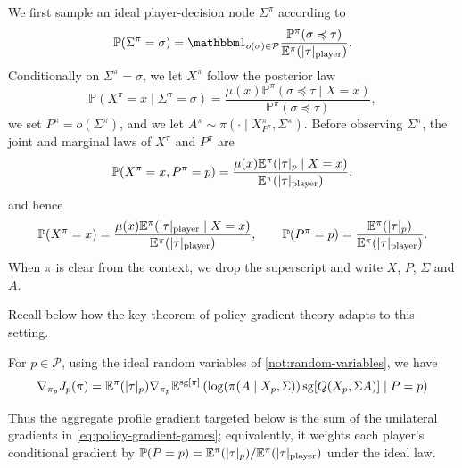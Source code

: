 \documentclass[12pt, a4paper]{article}
\begin{document}
\begin{notation}\label{not:random-variables}
We first sample an ideal player-decision node $\Sigma^\pi$ according to
\begin{equation}\label{eq:stationary-node-law}
  \mathbb{P}(\Sigma^\pi = \sigma)
  = \one_{o(\sigma)\in\mathcal P}
  \frac{\mathbb{P}^\pi(\sigma \preccurlyeq \tau)}
       {\mathbb{E}^\pi(|\tau|_{\textnormal{player}})}.
\end{equation}
Conditionally on $\Sigma^\pi=\sigma$, we let $X^\pi$ follow the posterior law
\begin{equation}\label{eq:ideal-private-profile-law}
  \mathbb{P}(X^\pi=x\mid\Sigma^\pi=\sigma)
  =
  \frac{\mu(x)\mathbb{P}^\pi(\sigma\preccurlyeq\tau\mid X=x)}
       {\mathbb{P}^\pi(\sigma\preccurlyeq\tau)},
\end{equation}
we set $P^\pi=o(\Sigma^\pi)$, and we let
$A^\pi\sim\pi(\cdot\mid X^\pi_{P^\pi},\Sigma^\pi)$.
Before observing $\Sigma^\pi$, the joint and marginal laws of $X^\pi$ and $P^\pi$ are
\begin{equation}\label{eq:ideal-profile-player-law}
  \mathbb{P}(X^\pi=x,P^\pi=p)
  = \frac{\mu(x)\mathbb{E}^\pi(|\tau|_p\mid X=x)}
           {\mathbb{E}^\pi(|\tau|_{\textnormal{player}})},
\end{equation}
and hence
\begin{equation}\label{eq:ideal-profile-and-player-marginals}
  \mathbb{P}(X^\pi=x)
  = \frac{\mu(x)\mathbb{E}^\pi(|\tau|_{\textnormal{player}}\mid X=x)}
           {\mathbb{E}^\pi(|\tau|_{\textnormal{player}})},
  \qquad
  \mathbb{P}(P^\pi=p)
  = \frac{\mathbb{E}^\pi(|\tau|_p)}
           {\mathbb{E}^\pi(|\tau|_{\textnormal{player}})}.
\end{equation}
When $\pi$ is clear from the context, we drop the superscript and write $X$, $P$, $\Sigma$ and $A$.
\end{notation}

Recall below how the key theorem of policy gradient theory adapts to this setting.

\begin{theorem}\label{thm:policy-gradient-games}
  For $p \in \mathcal{P}$, using the ideal random variables of \autoref{not:random-variables}, we have
  \begin{equation}\label{eq:policy-gradient-games}
    \nabla_{\pi_p} J_p(\pi)
    = \mathbb{E}^\pi(|\tau|_{p}) \nabla_{\pi_p} \mathbb{E}^{\operatorname{sg}[\pi]}\left(\log(\pi(A \mid X_p, \Sigma)) \operatorname{sg}[Q(X_p, \Sigma A)] \mid P = p\right)
  \end{equation}
\end{theorem}
Thus the aggregate profile gradient targeted below is the sum of the unilateral gradients in \autoref{eq:policy-gradient-games}; equivalently, it weights each player's conditional gradient by $\mathbb P(P=p)=\mathbb E^\pi(|\tau|_p)/\mathbb E^\pi(|\tau|_{\textnormal{player}})$ under the ideal law.
\end{document}
